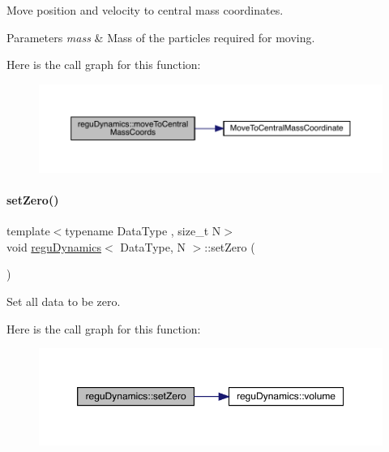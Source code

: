 Move position and velocity to central mass coordinates. 
\begin{DoxyParams}{Parameters}
{\em mass} & Mass of the particles required for moving. \\
\hline
\end{DoxyParams}
Here is the call graph for this function\+:\nopagebreak
\begin{figure}[H]
\begin{center}
\leavevmode
\includegraphics[width=350pt]{classregu_dynamics_adb57f1775922d615b8e506eaf79a1bc0_cgraph}
\end{center}
\end{figure}
\mbox{\label{classregu_dynamics_a50e6ec7efc990c325d3694e225f04194}} 
\paragraph{\texorpdfstring{set\+Zero()}{setZero()}}
{\footnotesize\ttfamily template$<$typename Data\+Type , size\+\_\+t N$>$ \\
void \mbox{\hyperlink{classregu_dynamics}{regu\+Dynamics}}$<$ Data\+Type, N $>$\+::set\+Zero (\begin{DoxyParamCaption}{ }\end{DoxyParamCaption})\hspace{0.3cm}{\ttfamily [inline]}}



Set all data to be zero. 

Here is the call graph for this function\+:\nopagebreak
\begin{figure}[H]
\begin{center}
\leavevmode
\includegraphics[width=350pt]{classregu_dynamics_a50e6ec7efc990c325d3694e225f04194_cgraph}
\end{center}
\end{figure}
\mbox{\label{classregu_dynamics_a794ed66952b542ae63caa936e3641c4a}} 
